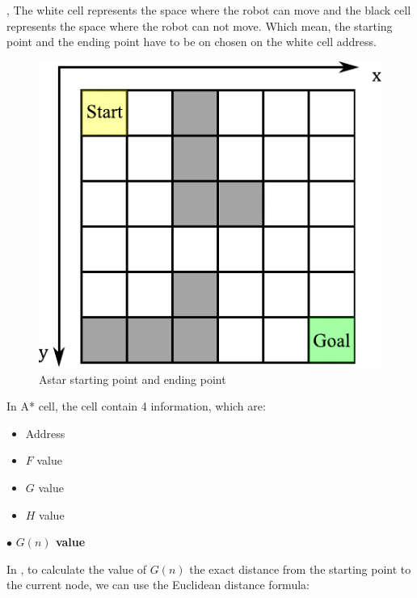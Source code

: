 \hspace{1.27cm}
\textbf{\figureautorefname{ \ref{fig:Astar starting point and ending point}}}, The white cell represents the space where the robot can move and the black cell represents the space where the robot can not move. Which mean, the starting point and the ending point have to be on chosen on the white cell address.\par
\begin{figure}[ht]
	\centering
	\includegraphics[scale=1]{images/imagess/6pp-ocm-start-goal.pdf}
	\caption{Astar starting point and ending point}
	\label{fig:Astar starting point and ending point}
\end{figure}


In A* cell, the cell contain 4 information, which are:
\begin{itemize}
	\item Address
	\item \(F\) value
	\item \(G\) value
	\item \(H\) value
\end{itemize}
\break
$\bullet$ \textbf{$G(n)$ value}\par
\hspace{1.27cm}
In \textbf{\figureautorefname{ \ref{fig:Euclidean Distance of G value}}}, to calculate the value of \(G(n)\) the exact distance from the starting point to the current node, we can use the Euclidean distance formula:\par

